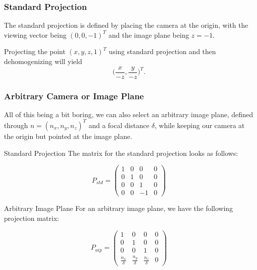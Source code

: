 \documentclass{panikzettel}
\begin{document}
\begin{halfboxl}
\subsubsection*{Standard Projection}


The standard projection is defined by placing the camera at the origin, with the viewing vector being $(0, 0, -1)^T$ and the image plane being $z = -1$.

Projecting the point $(x, y, z, 1)^T$ using standard projection and then dehomogenizing will yield $$\big( \frac{x}{-z}, \frac{y}{-z}\big)^T.$$

\subsubsection*{Arbitrary Camera or Image Plane}

All of this being a bit boring, we can also select an arbitrary image plane, defined through $n =(n_x, n_y, n_z)^T$ and a focal distance $\delta$, while keeping our camera at the origin but pointed at the image plane.

\end{halfboxl}%
\begin{halfboxr}
\vspace{-\baselineskip}
\begin{defi}{Standard Projection}
The matrix for the standard projection looks as follows:

$$P_{std} =
\begin{pmatrix}
1 & 0 & 0 & 0 \\
0 & 1 & 0 & 0 \\
0 & 0 & 1 & 0 \\
0 & 0 & -1 & 0
\end{pmatrix}$$
\end{defi}

\begin{defi}{Arbitrary Image Plane}
For an arbitrary image plane, we have the following projection matrix:

$$P_{aip} =
\begin{pmatrix}
1 & 0 & 0 & 0 \\
0 & 1 & 0 & 0 \\
0 & 0 & 1 & 0 \\
\frac{n_x}{\delta} & \frac{n_y}{\delta} & \frac{n_z}{\delta} & 0
\end{pmatrix}$$
\end{defi}
\end{halfboxr}
\end{document}

